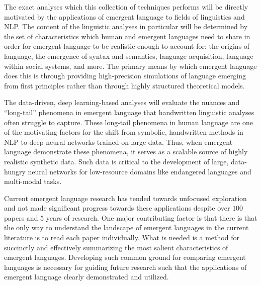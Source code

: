 The exact analyses which this collection of techniques performs will be directly motivated by the applications of emergent language to fields of linguistics and NLP.\sentspace{}
The content of the linguistic analyses in particular will be determined by the set of characteristics which human and emergent languages need to share in order for emergent language to be realistic enough to account for: 
    the origins of language, the emergence of syntax and semantics, language acquisition, language within social systems, and more.
The primary means by which emergent language does this is through providing high-precision simulations of language emerging from first principles rather than through highly structured theoretical models.

The data-driven, deep learning-based analyses will evaluate the nuances and ``long-tail'' phenomena in emergent language that handwritten linguistic analyses often struggle to capture.
These long-tail phenomena in human language are one of the motivating factors for the shift from symbolic, handwritten methods in NLP to deep neural networks trained on large data.
Thus, when emergent language demonstrate these phenomena, it serves as a scalable source of highly realistic synthetic data.
Such data is critical to the development of large, data-hungry neural networks for low-resource domains like endangered languages and multi-modal tasks.

Current emergent language research has tended towards unfocused exploration and not made significant progress towards these applications despite over $100$ papers and $5$ years of research.
One major contributing factor is that there is that the only way to understand the landscape of emergent languages in the current literature is to read each paper individually.
What is needed is a method for succinctly and effectively summarizing the most salient characteristics of emergent languages.
Developing such common ground for comparing emergent languages is necessary for guiding future research such that the applications of emergent language clearly demonstrated and utilized.


